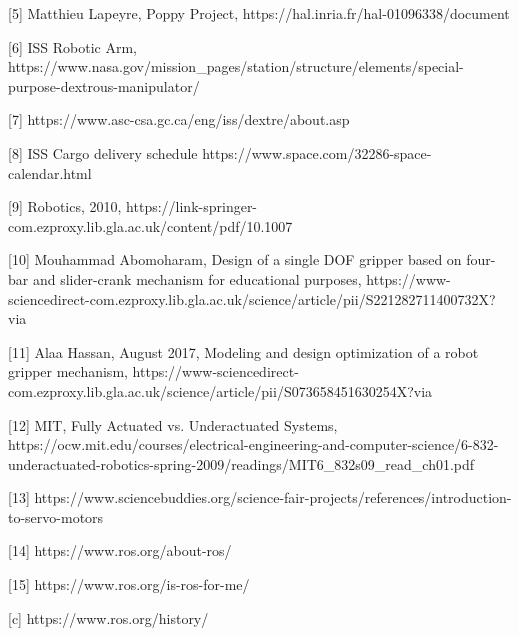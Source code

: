 \documentclass{l4proj}
\begin{document}
[5] Matthieu Lapeyre, Poppy Project, https://hal.inria.fr/hal-01096338/document

[6] ISS Robotic Arm, https://www.nasa.gov/mission_pages/station/structure/elements/special-purpose-dextrous-manipulator/

[7] https://www.asc-csa.gc.ca/eng/iss/dextre/about.asp

[8] ISS Cargo delivery schedule https://www.space.com/32286-space-calendar.html

[9] Robotics, 2010, https://link-springer-com.ezproxy.lib.gla.ac.uk/content/pdf/10.1007%

[10] Mouhammad Abomoharam, Design of a single DOF gripper based on four-bar and slider-crank mechanism for educational purposes, https://www-sciencedirect-com.ezproxy.lib.gla.ac.uk/science/article/pii/S221282711400732X?via%

[11] Alaa Hassan, August 2017, Modeling and design optimization of a robot gripper mechanism, https://www-sciencedirect-com.ezproxy.lib.gla.ac.uk/science/article/pii/S073658451630254X?via%

[12] MIT, Fully Actuated vs. Underactuated Systems, https://ocw.mit.edu/courses/electrical-engineering-and-computer-science/6-832-underactuated-robotics-spring-2009/readings/MIT6_832s09_read_ch01.pdf

[13] https://www.sciencebuddies.org/science-fair-projects/references/introduction-to-servo-motors

[14] https://www.ros.org/about-ros/

[15] https://www.ros.org/is-ros-for-me/

[c] https://www.ros.org/history/
\end{document}
